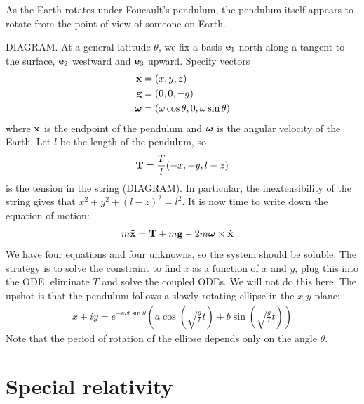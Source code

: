 \documentclass{../template/note}
\begin{document}

    \begin{example}
        As the Earth rotates under Foucault's pendulum, the pendulum itself appears to rotate from the point of view of someone on Earth.

        DIAGRAM. At a general latitude \(\theta\), we fix a basis \(\V e_1\) north along a tangent to the surface, \(\V e_2\) westward and \(\V e_3\) upward. Specify vectors
        \begin{align*}
            \V x &= (x, y, z) \\
            \V g &= (0, 0, -g) \\
            \V \omega &= (\omega \cos \theta, 0, \omega \sin \theta)
        \end{align*}
        where \(\V x\) is the endpoint of the pendulum and \(\V \omega\) is the angular velocity of the Earth. Let \(l\) be the length of the pendulum, so 
        \begin{align*}
            \V T = \frac{T}{l} (-x, -y, l-z)
        \end{align*}
        is the tension in the string (DIAGRAM). In particular, the inextensibility of the string gives that \(x^2 + y^2 + (l-z)^2 = l^2\). It is now time to write down the equation of motion:
        \begin{align*}
            m \ddot{\V x} &= \V T + m \V g - 2m \V \omega \times \dot{\V x}
        \end{align*}
        We have four equations and four unknowns, so the system should be soluble. The strategy is to solve the constraint to find \(z\) as a function of \(x\) and \(y\), plug this into the ODE, eliminate \(T\) and solve the coupled ODEs. We will not do this here. The upshot is that the pendulum follows a slowly rotating ellipse in the \(x\)-\(y\) plane:
        \begin{align*}
            x+iy = e^{-i\omega t \sin \theta}\left(a \cos\left(\sqrt{\frac g l}t\right)+b \sin\left(\sqrt{\frac g l}t\right)\right)
        \end{align*}
        Note that the period of rotation of the ellipse depends only on the angle \(\theta\).
    \end{example}
    
    \section{Special relativity}
\end{document}
